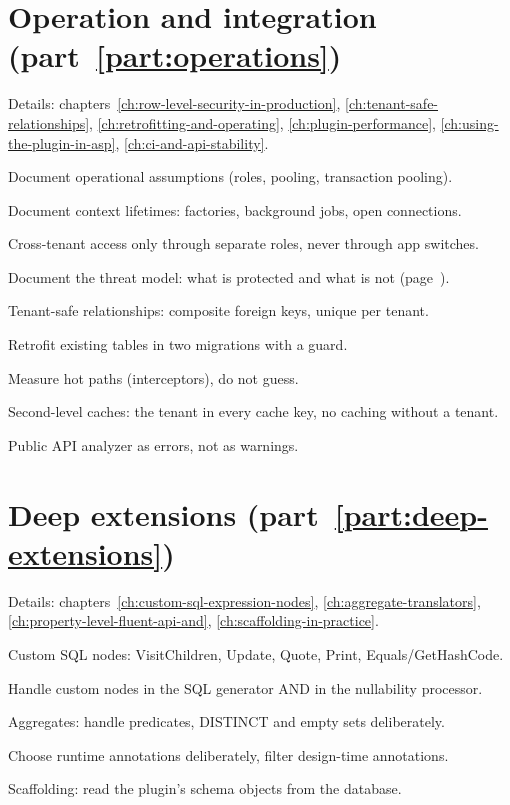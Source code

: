 \section{Operation and integration (part~\ref{part:operations})}

\noindent Details: chapters~\ref{ch:row-level-security-in-production}, \ref{ch:tenant-safe-relationships}, \ref{ch:retrofitting-and-operating}, \ref{ch:plugin-performance}, \ref{ch:using-the-plugin-in-asp}, \ref{ch:ci-and-api-stability}.

\begin{checklist}
  \item Document operational assumptions (roles, pooling, transaction pooling).
  \item Document context lifetimes: factories, background jobs, open connections.
  \item Cross-tenant access only through separate roles, never through app switches.
  \item Document the threat model: what is protected and what is not
    (page~\pageref{sec:threat-model}).
  \item Tenant-safe relationships: composite foreign keys, unique per tenant.
  \item Retrofit existing tables in two migrations with a guard.
  \item Measure hot paths (interceptors), do not guess.
  \item Second-level caches: the tenant in every cache key, no caching without a tenant.
  \item Public API analyzer as errors, not as warnings.
\end{checklist}

\section{Deep extensions (part~\ref{part:deep-extensions})}

\noindent Details: chapters~\ref{ch:custom-sql-expression-nodes}, \ref{ch:aggregate-translators}, \ref{ch:property-level-fluent-api-and}, \ref{ch:scaffolding-in-practice}.

\begin{checklist}
  \item Custom SQL nodes: VisitChildren, Update, Quote, Print, Equals/GetHashCode.
  \item Handle custom nodes in the SQL generator AND in the nullability processor.
  \item Aggregates: handle predicates, DISTINCT and empty sets deliberately.
  \item Choose runtime annotations deliberately, filter design-time annotations.
  \item Scaffolding: read the plugin's schema objects from the database.
\end{checklist}

